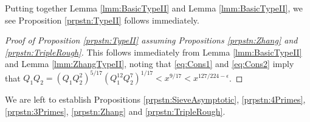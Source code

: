 \documentclass[10pt]{amsart}
\theoremstyle{plain}
\numberwithin{equation}{section}
\begin{document}
%
%
%
%
Putting together Lemma \ref{lmm:BasicTypeII} and Lemma \ref{lmm:BasicTypeII}, we see Proposition \ref{prpstn:TypeII} follows immediately.
%
%
%
%
%
%
%
%
\begin{proof}[Proof of Proposition \ref{prpstn:TypeII} assuming Propositions \ref{prpstn:Zhang} and \ref{prpstn:TripleRough}]
This follows immediately from Lemma \ref{lmm:BasicTypeII} and Lemma \ref{lmm:ZhangTypeII}, noting that \eqref{eq:Cons1} and \eqref{eq:Cons2} imply that $Q_1Q_2=(Q_1Q_2^2)^{5/17}(Q_1^{12}Q_2^{7})^{1/17}<x^{9/17}<x^{127/224-\epsilon}$. 
\end{proof}
%
%
We are left to establish Propositions \ref{prpstn:SieveAsymptotic}, \ref{prpstn:4Primes}, \ref{prpstn:3Primes}, \ref{prpstn:Zhang} and \ref{prpstn:TripleRough}.
%
%
%
%
%
%
%
%
%
%
%
%
%
%
%
%
%
%
\end{document}
